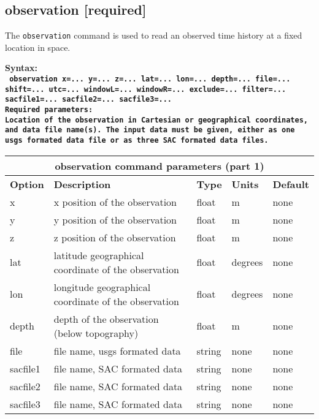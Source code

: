 \documentclass[11pt]{report}
\begin{document}
\subsection{observation [required]}
The \verb+observation+ command is used to read an observed time history at a fixed
location in space. 
\begin{flushleft}
\bf
Syntax:\\
\tt
observation x=... y=... z=... lat=... lon=... depth=... file=... shift=... utc=... windowL=... windowR=... exclude=... filter=... sacfile1=... sacfile2=... sacfile3=... 
\\
{\bf Required parameters:}\\
\rm Location of the observation in Cartesian or geographical coordinates, and data file name(s).
The input data must be given, either as one usgs formated data file or as three SAC formated data files.
\end{flushleft}
%
\begin{center}
\begin{tabular}{|l|p{8cm}|l|l|l|} \hline
\multicolumn{5}{|c|}{\bf observation command parameters (part 1)}\\ \hline
\bf{Option} & \bf{Description} & \bf{Type} & \bf{Units} & \bf{Default} \\ \hline \hline
x & x position of the observation & float & m & none \\ \hline
y & y position of the observation & float & m & none \\ \hline
z & z position of the observation & float & m & none \\ \hline
\hline
lat & latitude geographical coordinate of the observation & float & degrees & none \\ \hline
lon & longitude geographical coordinate of the observation & float & degrees & none \\ \hline
depth & depth of the observation (below topography) & float & m & none \\ \hline
\hline
file & file name, usgs formated data  & string & none & none \\ \hline
\hline
sacfile1 & file name, SAC formated data & string & none & none \\ \hline
sacfile2 & file name, SAC formated data & string & none & none \\ \hline
sacfile3 & file name, SAC formated data & string & none & none \\ \hline
\end{tabular}
\end{center}
\end{document}
